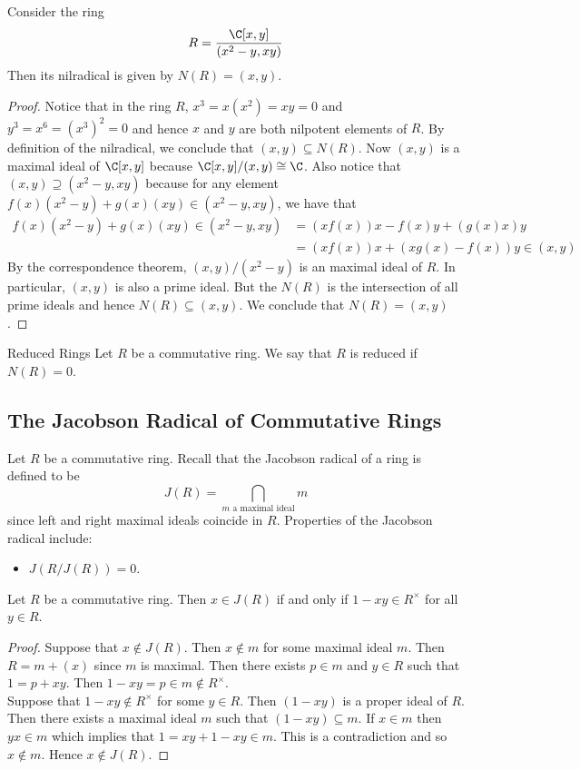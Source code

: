 \documentclass[a4paper]{article}
\begin{document}
\begin{eg}{}{} Consider the ring $$R=\frac{\C[x,y]}{(x^2-y,xy)}$$ Then its nilradical is given by $N(R)=(x,y)$. 
\begin{proof}
Notice that in the ring $R$, $x^3=x(x^2)=xy=0$ and $y^3=x^6=(x^3)^2=0$ and hence $x$ and $y$ are both nilpotent elements of $R$. By definition of the nilradical, we conclude that $(x,y)\subseteq N(R)$. Now $(x,y)$ is a maximal ideal of $\C[x,y]$ because $\C[x,y]/(x,y)\cong\C$. Also notice that $(x,y)\supseteq(x^2-y,xy)$ because for any element $f(x)(x^2-y)+g(x)(xy)\in(x^2-y,xy)$, we have that 
\begin{align*}
f(x)(x^2-y)+g(x)(xy)\in(x^2-y,xy)&=(xf(x))x-f(x)y+(g(x)x)y\\
&=(xf(x))x+(xg(x)-f(x))y\in (x,y)
\end{align*}
By the correspondence theorem, $(x,y)/(x^2-y)$ is an maximal ideal of $R$. In particular, $(x,y)$ is also a prime ideal. But the $N(R)$ is the intersection of all prime ideals and hence $N(R)\subseteq(x,y)$. We conclude that $N(R)=(x,y)$. 
\end{proof}
\end{eg}

\begin{defn}{Reduced Rings}{} Let $R$ be a commutative ring. We say that $R$ is reduced if $N(R)=0$. 
\end{defn}

\subsection{The Jacobson Radical of Commutative Rings}
Let $R$ be a commutative ring. Recall that the Jacobson radical of a ring is defined to be $$J(R)=\bigcap_{m\text{ a maximal ideal}}m$$ since left and right maximal ideals coincide in $R$. Properties of the Jacobson radical include: 
\begin{itemize}
\item $J(R/J(R))=0$. 
\end{itemize}

\begin{lmm}{}{} Let $R$ be a commutative ring. Then $x\in J(R)$ if and only if $1-xy\in R^\times$ for all $y\in R$. 
\begin{proof}
Suppose that $x\notin J(R)$. Then $x\notin m$ for some maximal ideal $m$. Then $R=m+(x)$ since $m$ is maximal. Then there exists $p\in m$ and $y\in R$ such that $1=p+xy$. Then $1-xy=p\in m\notin R^\times$. \\

Suppose that $1-xy\notin R^\times$ for some $y\in R$. Then $(1-xy)$ is a proper ideal of $R$. Then there exists a maximal ideal $m$ such that $(1-xy)\subseteq m$. If $x\in m$ then $yx\in m$ which implies that $1=xy+1-xy\in m$. This is a contradiction and so $x\notin m$. Hence $x\notin J(R)$. 
\end{proof}
\end{lmm}
\end{document}
